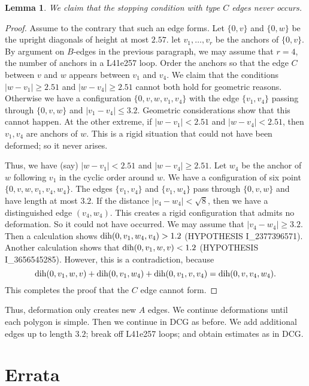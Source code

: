 \documentclass[11pt]{amsart}
\def\op#1{{\text{#1}}}
\def\text{\hbox}
\newtheorem{lemma}[subsubsection]{Lemma}
\begin{document}
\begin{lemma}
We claim that the stopping condition with type $C$ edges never
occurs.
\end{lemma}

\begin{proof}
Assume to the contrary that such an edge forms.
Let $\{0,v\}$ and $\{0,w\}$ be the upright diagonals of height at most
$2.57$.  let $v_1,\ldots,v_r$ be the anchors of $\{0,v\}$.  By argument on $B$-edges in the previous
paragraph, we may assume that $r=4$, the number of anchors in a L41e257 loop.  Order the anchors so
that the edge $C$ between $v$ and $w$ appears
between $v_1$ and $v_4$.  We claim that the
conditions $|w-v_1|\ge 2.51$ and $|w-v_4|\ge 2.51$ cannot
both hold for geometric reasons.
Otherwise we have a configuration $\{0,v,w,v_1,v_4\}$ with the edge $\{v_1,v_4\}$ passing through $\{0,v,w\}$ and $|v_1-v_4|\le 3.2$.  Geometric considerations show that this cannot happen.  At the other extreme, if $|w-v_1|<2.51$ and $|w-v_4|<2.51$, then $v_1,v_4$ are anchors of $w$.  This is a rigid situation that could not have been deformed; so it never arises.  

Thus, we have (say) $|w-v_1|<2.51$ and $|w-v_4|\ge 2.51$.  Let $w_4$ be the anchor of $w$ following $v_1$ in the cyclic order around $w$.
We have a configuration of six point $\{0,v,w,v_1,v_4,w_4\}$.  The edges $\{v_1,v_4\}$ and $\{v_1,w_4\}$ pass through $\{0,v,w\}$ and have length at most $3.2$.  If the distance $|v_4-w_4|<\sqrt8$, then we have a distinguished edge $(v_4,w_4)$.  This creates a rigid configuration that admits no deformation.  So it could not have occurred.  We may assume that $|v_4-w_4|\ge 3.2$.  Then a calculation shows $\op{dih}(0,v_1,w_4,v_4) > 1.2$ (HYPOTHESIS I\_2377396571).    Another calculation shows that
$\op{dih}(0,v_1,w,v) < 1.2$ (HYPOTHESIS I\_3656545285).  However, this is a contradiction, because
  $$
  \op{dih}(0,v_1,w,v)+\op{dih}(0,v_1,w_4) + \op{dih}(0,v_1,v,v_4) = \op{dih}(0,v,v_4,w_4).
  $$
This completes the proof that the $C$ edge cannot form.
\end{proof}



Thus, deformation only creates new $A$ edges.  We continue deformations until each polygon is simple.  Then we continue in DCG as before.  We add additional edges up to length $3.2$; break off L41e257 loops; and obtain estimates as in DCG.


{}\baselineskip
\section{Errata}
\end{document}
